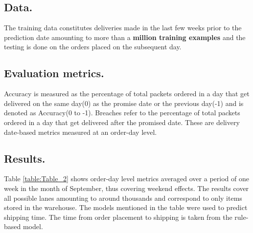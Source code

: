 \documentclass[twoside,leqno,twocolumn]{article}
\begin{document}
\subsection{Data.}
The training data constitutes deliveries made in the last few weeks prior to the prediction date amounting to more than a \textbf{million training examples} and the testing is done on the orders placed on the subsequent day.
\subsection{Evaluation metrics.}
Accuracy is measured as the percentage of total packets ordered in a day that get delivered on the same day(0) as the promise date or the previous day(-1) and is denoted as Accuracy(0 to -1). Breaches refer to the percentage of total packets ordered in a day that get delivered after the promised date. These are delivery date-based metrics measured at an order-day level.

\subsection{Results.}
Table \ref{table:Table_2} shows order-day level metrics averaged over a period of one week in the month of September, thus covering weekend effects. The results cover all possible lanes amounting to around thousands and correspond to only items stored in the warehouse. The models mentioned in the table were used to predict shipping time. The time from order placement to shipping is taken from the rule-based model.
\end{document}
